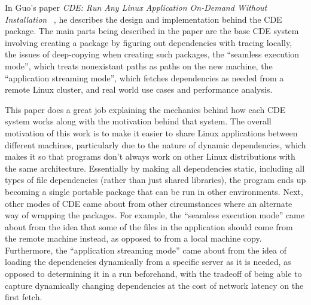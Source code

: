 \documentclass[11pt]{article}
\newcommand{\cde}{\textsc{CDE}\xspace}
\begin{document}
In Guo's paper \textit{CDE: Run Any Linux Application On-Demand Without Installation} ~\cite{10.1109/MCSE.2012.36}, he describes the design and implementation behind the \cde package. The main parts being described in the paper are the base \cde system involving creating a package by figuring out dependencies with tracing locally, the issues of deep-copying when creating such packages, the ``seamless execution mode'', which treats nonexistant paths as paths on the new machine, the ``application streaming mode'', which fetches dependencies as needed from a remote Linux cluster, and real world use cases and performance analysis.

This paper does a great job explaining the mechanics behind how each \cde system works along with the motivation behind that system. The overall motivation of this work is to make it easier to share Linux applications between different machines, particularly due to the nature of dynamic dependencies, which makes it so that programs don't always work on other Linux distributions with the same architecture. Essentially by making all dependencies static, including all types of file dependencies (rather than just shared libraries), the program ends up becoming a single portable package that can be run in other environments. Next, other modes of \cde came about from other circumstances where an alternate way of wrapping the packages. For example, the ``seamless execution mode'' came about from the idea that some of the files in the application should come from the remote machine instead, as opposed to from a local machine copy. Furthermore, the ``application streaming mode'' came about from the idea of loading the dependencies dynamically from a specific server as it is needed, as opposed to determining it in a run beforehand, with the tradeoff of being able to capture dynamically changing dependencies at the cost of network latency on the first fetch.
\end{document}

